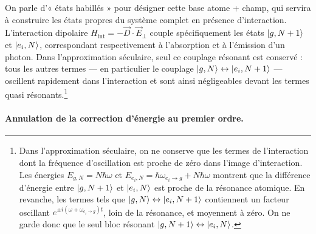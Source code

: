 
On parle d’« états habillés » pour désigner cette base atome + champ, qui servira à construire 
les états propres du système complet en présence d’interaction. 
L’interaction dipolaire 
\(
    H_{\text{int}} = - \vec{D} \cdot \vec{E}_\perp
\)
couple spécifiquement les états \( \ket{g, N+1} \) et \( \ket{e_i, N} \), 
correspondant respectivement à l’absorption et à l’émission d’un photon. 
Dans l’approximation séculaire, seul ce couplage résonant est conservé : 
tous les autres termes — en particulier le couplage 
\( \ket{g, N} \leftrightarrow \ket{e_i, N+1} \) — oscillent rapidement dans l’interaction 
et sont ainsi négligeables devant les termes quasi résonants.\footnote{
Dans l’approximation séculaire, on ne conserve que les termes de l’interaction dont la 
fréquence d’oscillation est proche de zéro dans l’image d’interaction.  
Les énergies 
\( E_{g,N} = N \hbar \omega \) et 
\( E_{e_i,N} = \hbar\omega_{e_i\rightarrow g} + N\hbar\omega \)
montrent que la différence d’énergie entre 
\( \ket{g,N+1} \) et \( \ket{e_i,N} \) est 
proche de la résonance atomique.  
En revanche, les termes tels que 
\( \ket{g,N} \leftrightarrow \ket{e_i,N+1} \) 
contiennent un facteur oscillant 
\( e^{\pm i(\omega + \omega_{e_i\rightarrow g})t} \), 
loin de la résonance, et moyennent à zéro. 
On ne garde donc que le seul bloc résonant 
\( \ket{g,N+1} \leftrightarrow \ket{e_i,N} \).
}



\medskip

\paragraph{Annulation de la correction d’énergie au premier ordre. \cite{Le_Kien_2013,grimm1999opticaldipoletrapsneutral} }

